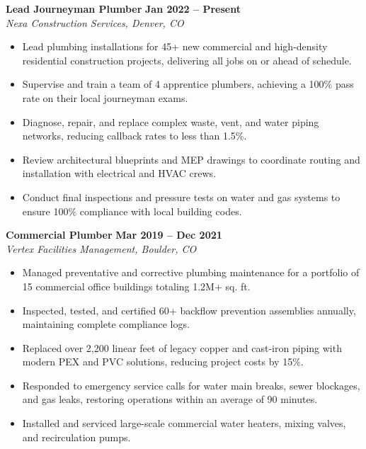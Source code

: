 \documentclass[10pt]{article}
\begin{document}
\noindent
\textbf{Lead Journeyman Plumber} \hfill \textbf{Jan 2022 -- Present} \\
\textit{Nexa Construction Services, Denver, CO} \\
\vspace{-4pt}
\begin{itemize}
  \item Lead plumbing installations for 45+ new commercial and high-density residential construction projects, delivering all jobs on or ahead of schedule.
  \item Supervise and train a team of 4 apprentice plumbers, achieving a 100\% pass rate on their local journeyman exams.
  \item Diagnose, repair, and replace complex waste, vent, and water piping networks, reducing callback rates to less than 1.5\%.
  \item Review architectural blueprints and MEP drawings to coordinate routing and installation with electrical and HVAC crews.
  \item Conduct final inspections and pressure tests on water and gas systems to ensure 100\% compliance with local building codes.
\end{itemize}
\vspace{4pt}

\noindent
\textbf{Commercial Plumber} \hfill \textbf{Mar 2019 -- Dec 2021} \\
\textit{Vertex Facilities Management, Boulder, CO} \\
\vspace{-4pt}
\begin{itemize}
  \item Managed preventative and corrective plumbing maintenance for a portfolio of 15 commercial office buildings totaling 1.2M+ sq. ft.
  \item Inspected, tested, and certified 60+ backflow prevention assemblies annually, maintaining complete compliance logs.
  \item Replaced over 2,200 linear feet of legacy copper and cast-iron piping with modern PEX and PVC solutions, reducing project costs by 15\%.
  \item Responded to emergency service calls for water main breaks, sewer blockages, and gas leaks, restoring operations within an average of 90 minutes.
  \item Installed and serviced large-scale commercial water heaters, mixing valves, and recirculation pumps.
\end{itemize}
\vspace{4pt}
\end{document}

